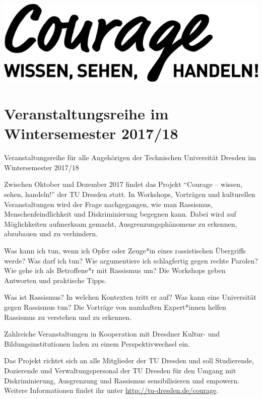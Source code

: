 \begin{center}
  \includegraphics[width=\textwidth]{./courage-logo-bw.png}
\end{center}
\section*{Veranstaltungsreihe im Wintersemester 2017/18}
\label{sec:veranstaltungsreihe_courage -- wissen, sehen, handeln!_}
Veranstaltungsreihe für alle Angehörigen der Technischen Universität Dresden im Wintersemester 2017/18

Zwischen Oktober und Dezember 2017 findet das Projekt \enquote{Courage -- wissen, sehen, handeln!} der TU Dresden statt.
In Workshops, Vorträgen und kulturellen Veranstaltungen wird der Frage nachgegangen, wie man Rassismus, Menschenfeindlichkeit und Diskriminierung begegnen kann. Dabei wird auf Möglichkeiten aufmerksam gemacht, Ausgrenzungsphänomene zu erkennen, abzubauen und zu verhindern. 

 Was kann ich tun, wenn ich Opfer oder Zeuge*in eines rassistischen Übergriffs werde? Was darf ich tun? Wie argumentiere ich schlagfertig gegen rechte Parolen? Wie gehe ich als Betroffene*r mit Rassismus um? Die Workshops geben Antworten und praktische Tipps.

 Was ist Rassismus? In welchen Kontexten tritt er auf? Was kann eine Universität gegen Rassismus tun? Die Vorträge von namhaften Expert*innen helfen Rassismus zu verstehen und zu erkennen.

 Zahlreiche Veranstaltungen in Kooperation mit Dresdner Kultur- und Bildungsinstitutionen laden zu einem Perspektivwechsel ein.

Das Projekt richtet sich an alle Mitglieder der TU Dresden und soll Studierende, Dozierende und Verwaltungspersonal der TU Dresden für den Umgang mit Diskriminierung, Ausgrenzung und Rassismus sensibilisieren und empowern. Weitere Informationen findet ihr unter \url{http://tu-dresden.de/courage}.
